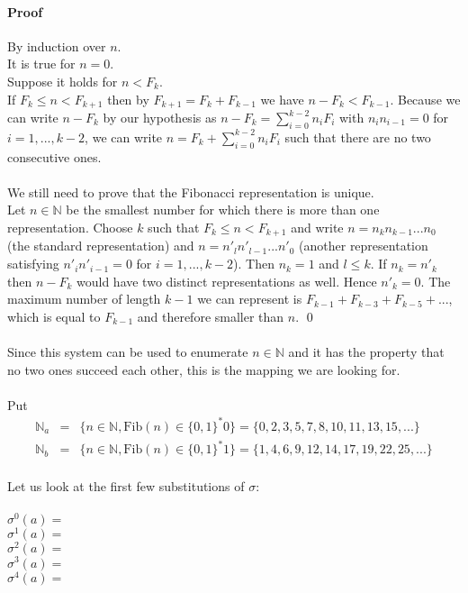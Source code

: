 \documentclass{article}
\begin{document}
\paragraph{Proof} By induction over $n$.\\
It is true for $n = 0$.\\
Suppose it holds for $n < F_k$.\\
If $F_k \le n < F_{k + 1}$ then by $F_{k + 1} = F_k + F_{k - 1}$ we have 
$n - F_k < F_{k - 1}$. Because we can write $n - F_k$ by our hypothesis as
$n - F_k = \sum_{i = 0}^{k - 2} n_i F_i$ with $n_i n_{i - 1} = 0$ for
$i = 1, ..., k - 2$, we can write $n = F_k + \sum_{i = 0}^{k - 2} n_i F_i$ 
such that there are no two consecutive ones.\\
\\
We still need to prove that the Fibonacci representation is unique.\\
Let $n \in \mathbb{N}$ be the smallest number for which there is more than one
representation. Choose $k$ such that $F_k \le n < F_{k + 1}$ and write
$n = n_k n_{k - 1} ... n_0$ (the standard representation) and
$n = n'_l n'_{l - 1} ... n'_0$ (another representation satisfying 
$n'_i n'_{i - 1} = 0$ for $i = 1, ..., k - 2$). Then $n_k = 1$ and $l \le k$.
If $n_k = n'_k$ then $n - F_k$ would have two distinct representations as well.
Hence $n'_k = 0$.
The maximum number of length $k - 1$ we can represent is 
$F_{k - 1} + F_{k - 3} + F_{k - 5} + ...$, which is equal to $F_{k - 1}$ and 
therefore smaller than $n$. \qed\\
\\
Since this system can be used to enumerate $n \in \mathbb{N}$ and it has the
property that no two ones succeed each other, this is the mapping we are
looking for.\\
\\
Put
\begin{eqnarray*}
  \mathbb{N}_a &=& \{n \in \mathbb{N}, \mathrm{Fib}(n) \in \{0, 1\}^* 0\} = 
                   \{0, 2, 3, 5, 7, 8, 10, 11, 13, 15, ...\}\\
  \mathbb{N}_b &=& \{n \in \mathbb{N}, \mathrm{Fib}(n) \in \{0, 1\}^* 1\} =
                   \{1, 4, 6, 9, 12, 14, 17, 19, 22, 25, ...\}
\end{eqnarray*}
\\
Let us look at the first few substitutions of $\sigma$:\\
\\
$\sigma^0(a) =$ \\
$\sigma^1(a) =$ \\
$\sigma^2(a) =$ \\
$\sigma^3(a) =$ \\
$\sigma^4(a) =$ 
\end{document}

